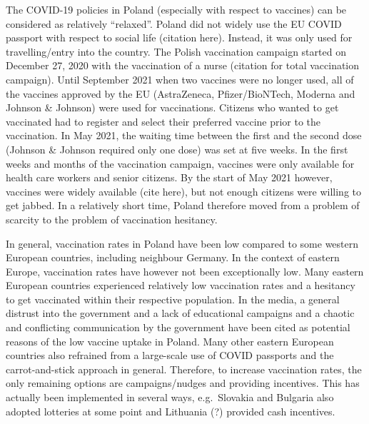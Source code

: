 \documentclass{scrbook}
\begin{document}
The COVID-19 policies in Poland (especially with respect to vaccines)
can be considered as relatively ``relaxed''. Poland did not widely use
the EU COVID passport with respect to social life (citation here).
Instead, it was only used for travelling/entry into the country. The
Polish vaccination campaign started on December 27, 2020 with the
vaccination of a nurse (citation for total vaccination campaign). Until
September 2021 when two vaccines were no longer used, all of the
vaccines approved by the EU (AstraZeneca, Pfizer/BioNTech, Moderna and
Johnson \& Johnson) were used for vaccinations. Citizens who wanted to
get vaccinated had to register and select their preferred vaccine prior
to the vaccination. In May 2021, the waiting time between the first and
the second dose (Johnson \& Johnson required only one dose) was set at
five weeks. In the first weeks and months of the vaccination campaign,
vaccines were only available for health care workers and senior
citizens. By the start of May 2021 however, vaccines were widely
available (cite here), but not enough citizens were willing to get
jabbed. In a relatively short time, Poland therefore moved from a
problem of scarcity to the problem of vaccination hesitancy.

In general, vaccination rates in Poland have been low compared to some
western European countries, including neighbour Germany. In the context
of eastern Europe, vaccination rates have however not been exceptionally
low. Many eastern European countries experienced relatively low
vaccination rates and a hesitancy to get vaccinated within their
respective population. In the media, a general distrust into the
government and a lack of educational campaigns
\parencite{noauthor_polands_2021} and a chaotic and conflicting
communication by the government \parencite{wanat_polands_2021} have been
cited as potential reasons of the low vaccine uptake in Poland. Many
other eastern European countries also refrained from a large-scale use
of COVID passports and the carrot-and-stick approach in general.
Therefore, to increase vaccination rates, the only remaining options are
campaigns/nudges and providing incentives. This has actually been
implemented in several ways, e.g.~Slovakia and Bulgaria also adopted
lotteries at some point and Lithuania (?) provided cash incentives.
\end{document}

